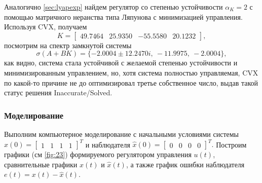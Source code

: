 Аналогично \autoref{sec:lyapexp} найдем регулятор со степенью устойчивости $\alpha_K=2$
с помощью матричного неранства типа Ляпунова с минимизацией управления. 
Используя CVX, получаем
\begin{equation*}
    K=\begin{bmatrix}
        49.7464&	25.9350&	-55.5580&	20.1232
    \end{bmatrix},
\end{equation*}
посмотрим на спектр замкнутой системы
\begin{equation*}
    \sigma(A+BK)=\{-2.0004 \pm12.2470i,\ -11.9975,\ -2.0004 \},
\end{equation*}
как видно, система стала устойчивой с желаемой степенью устойчивости и 
минимизированным управлением, но, хотя система полностью управляемая, 
CVX по какой-то причине не до оптимизировал третье собственное число, выдав
такой статус решения Inaccurate/Solved.


\subsubsection{Моделирование}

Выполним компьютерное моделирование с начальными условиями системы
$x(0)=\begin{bmatrix}
    1&1&1&1
\end{bmatrix}^T$ и наблюдателя $\hat x(0)=\begin{bmatrix}
    0&0&0&0
\end{bmatrix}^T.$ Построим графики (см \autoref{fig:23})
формируемого регулятором управления $u(t)$, сравнительные графики $x(t)$ и
$\hat x(t)$, а также график ошибки наблюдателя $e(t) = x(t) -\hat x(t).$

